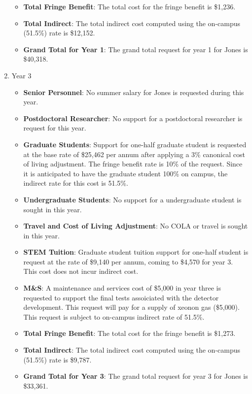 \begin{enumerate}
\begin{itemize}[noitemsep,nolistsep]
\item {{\bf Total Fringe Benefit}: The total cost for the fringe benefit is \$1,236.}

\item {{\bf Total Indirect}: The total indirect cost computed using the on-campus (51.5\%) rate is \$12,152.}

\item {{\bf Grand Total for Year 1}: The grand total request for year 1 for Jones is \$40,318.}

\end{itemize}

\item{Year 3}
\begin{itemize}[noitemsep,nolistsep]
\item{{\bf Senior Personnel}: No summer salary for Jones is requested during this year.}

\item {{\bf Postdoctoral Researcher}:  No support for a postdoctoral researcher is request for this year.} 

\item{{\bf Graduate Students}: Support for one-half graduate student is requested at the base rate of \$25,462 per annum after applying a 3\% canonical cost of living adjustment.   The fringe benefit rate is 10\% of the request.  Since it is anticipated to have the graduate student 100\% on campus, the indirect rate for this cost is 51.5\%.}

\item {{\bf Undergraduate Students}: No support for a undergraduate student is sought in this year.}

\item{{\bf Travel and Cost of Living Adjustment}: No COLA or travel is sought in this year.}

\item {{\bf STEM Tuition}: Graduate student tuition support for one-half student is request at the rate of \$9,140 per annum, coming to \$4,570 for year 3.  This cost does not incur indirect cost.}

\item {{\bf M\&S}: A maintenance and services cost of \$5,000 in year three is requested to support the final tests assoiciated with the detector development. This request will pay for a supply of xeonon gas (\$5,000). This request is subject to on-campus indirect rate of 51.5\%.}

\item {{\bf Total Fringe Benefit}: The total cost for the fringe benefit is \$1,273.}

\item {{\bf Total Indirect}: The total indirect cost computed using the on-campus (51.5\%) rate is \$9,787.}

\item {{\bf Grand Total for Year 3}: The grand total request for year 3 for Jones is \$33,361.}

\end{itemize}
\end{enumerate}

